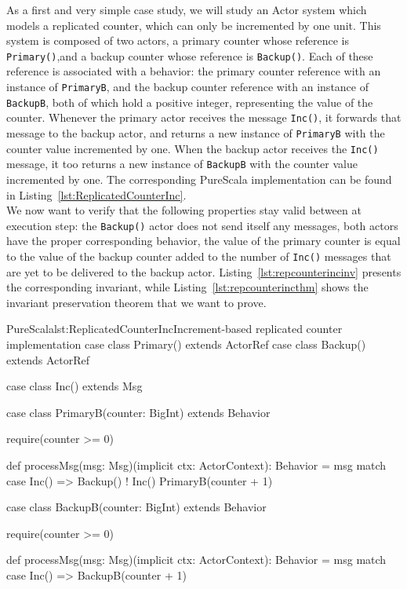 \documentclass[a4paper,twoside]{article}
\newcommand{\RefCode}[1]{Listing~\ref{#1}}
\newcommand{\stt}[1]{\texttt{\small{#1}}}
\begin{document}
As a first and very simple case study, we will study an Actor system which models a replicated counter, which can only be incremented by one unit. This system is composed of two actors, a primary counter whose reference is \stt{Primary()},and a backup counter whose reference is \stt{Backup()}. Each of these reference is associated with a behavior: the primary counter reference with an instance of \stt{PrimaryB}, and the backup counter reference with an instance of \stt{BackupB}, both of which hold a positive integer, representing the value of the counter. Whenever the primary actor receives the message \stt{Inc()}, it forwards that message to the backup actor, and returns a new instance of \stt{PrimaryB} with the counter value incremented by one. When the backup actor receives the \stt{Inc()} message, it too returns a new instance of \stt{BackupB} with the counter value incremented by one. The corresponding PureScala implementation can be found in \RefCode{lst:ReplicatedCounterInc}.\\

We now want to verify that the following properties stay valid between at execution step: the \stt{Backup()} actor does not send itself any messages, both actors have the proper corresponding behavior, the value of the primary counter is equal to the value of the backup counter added to the number of \stt{Inc()} messages that are yet to be delivered to the backup actor. \RefCode{lst:repcounterincinv} presents the corresponding invariant, while \RefCode{lst:repcounterincthm} shows the invariant preservation theorem that we want to prove.

\begin{Code}{PureScala}{lst:ReplicatedCounterInc}{Increment-based replicated counter implementation}
case class Primary() extends ActorRef
case class Backup()  extends ActorRef

case class Inc() extends Msg

case class PrimaryB(counter: BigInt) extends Behavior {
  require(counter >= 0)

  def processMsg(msg: Msg)(implicit ctx: ActorContext): Behavior = msg match {
    case Inc() =>
      Backup() ! Inc()
      PrimaryB(counter + 1)
  }
}

case class BackupB(counter: BigInt) extends Behavior {
  require(counter >= 0)

  def processMsg(msg: Msg)(implicit ctx: ActorContext): Behavior = msg match {
    case Inc() => BackupB(counter + 1)
  }
}
\end{Code}
\end{document}
